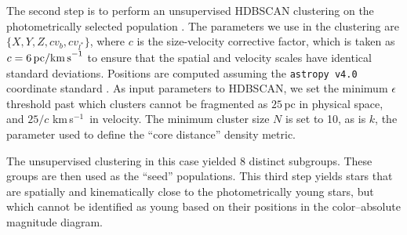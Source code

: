 \documentclass[12pt,twocolumn,tighten,linenumbers]{aastex63}
\newcommand{\kms}{\,km\,s$^{-1}$}
\begin{document}
The second step is to perform an unsupervised HDBSCAN clustering on
the photometrically selected population
\citep{campello_hierarchical_2015,mcinnes_hdbscan_2017}.  The
parameters we use in the clustering are $\{ X, Y, Z, c v_b, c v_{l^*}
\} $, where $c$ is
the size-velocity corrective factor, which is taken as $c=6\,{\rm pc /
km\,s}^{-1}$ to ensure that the spatial and velocity scales have
identical standard deviations.  Positions are computed assuming the
\texttt{astropy v4.0} coordinate standard
\citep{astropy_2018}. %
As input
parameters to HDBSCAN, we set the minimum $\epsilon$ threshold past
which clusters cannot be fragmented as $25$\,pc in physical space, and
$25/c$\,\kms\ in velocity.  The minimum cluster size $N$ is set to 10, as
is $k$, the parameter used to define the ``core distance'' density
metric. 

The unsupervised clustering in this case yielded 8 distinct subgroups.
These groups are then used as the ``seed'' populations.  This third step yields
stars that are spatially and kinematically close to the
photometrically young stars, but which cannot be identified as young
based on their positions in the color--absolute magnitude diagram.
\end{document}

